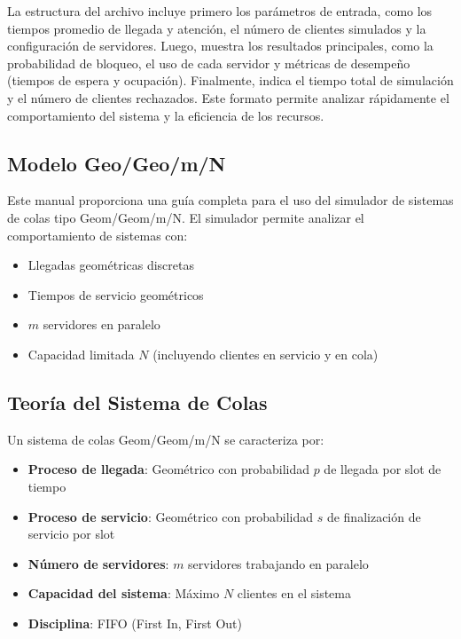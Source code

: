 \documentclass{article}
\begin{document}
La estructura del archivo incluye primero los parámetros de entrada, como los tiempos promedio de llegada y atención, el número de clientes simulados y la configuración de servidores. Luego, muestra los resultados principales, como la probabilidad de bloqueo, el uso de cada servidor y métricas de desempeño (tiempos de espera y ocupación). Finalmente, indica el tiempo total de simulación y el número de clientes rechazados. Este formato permite analizar rápidamente el comportamiento del sistema y la eficiencia de los recursos.


\subsection{Modelo Geo/Geo/m/N}\label{subsec:geogeo}

Este manual proporciona una guía completa para el uso del simulador de sistemas de colas tipo Geom/Geom/m/N. El simulador permite analizar el comportamiento de sistemas con:
\begin{itemize}
    \item Llegadas geométricas discretas
    \item Tiempos de servicio geométricos
    \item $m$ servidores en paralelo
    \item Capacidad limitada $N$ (incluyendo clientes en servicio y en cola)
\end{itemize}

\subsection{Teoría del Sistema de Colas}
Un sistema de colas Geom/Geom/m/N se caracteriza por:
\begin{itemize}
    \item \textbf{Proceso de llegada}: Geométrico con probabilidad $p$ de llegada por slot de tiempo
    \item \textbf{Proceso de servicio}: Geométrico con probabilidad $s$ de finalización de servicio por slot
    \item \textbf{Número de servidores}: $m$ servidores trabajando en paralelo
    \item \textbf{Capacidad del sistema}: Máximo $N$ clientes en el sistema
    \item \textbf{Disciplina}: FIFO (First In, First Out)
\end{itemize}
\end{document}
